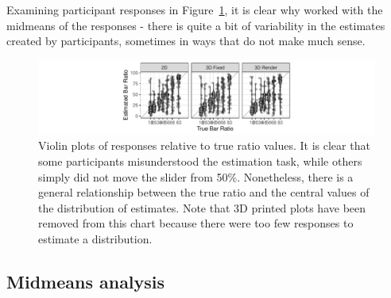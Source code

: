 \documentclass[runningheads
]{llncs}
\begin{document}
Examining participant responses in Figure~\ref{fig-violin-accuracy}, it
is clear why \textcite{clevelandGraphicalPerceptionTheory1984} worked
with the midmeans of the responses - there is quite a bit of variability
in the estimates created by participants, sometimes in ways that do not
make much sense.

\begin{figure}

{\centering \includegraphics{index_files/figure-pdf/fig-violin-accuracy-1.pdf}

}

\caption{\label{fig-violin-accuracy}Violin plots of responses relative
to true ratio values. It is clear that some participants misunderstood
the estimation task, while others simply did not move the slider from
50\%. Nonetheless, there is a general relationship between the true
ratio and the central values of the distribution of estimates. Note that
3D printed plots have been removed from this chart because there were
too few responses to estimate a distribution.}

\end{figure}

\hypertarget{midmeans-analysis}{%
\subsection{Midmeans analysis}\label{midmeans-analysis}}
\end{document}
